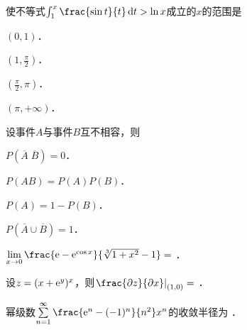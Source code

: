 \documentclass[plain,noanswer,medmath]{../../template/jnuexam}
\begin{document}










\begin{problem}
使不等式$\int_1^x \frac{\sin t}{t}\dt > \ln x$成立的$x$的范围是\pickout{}
\begin{abcd}
\item $(0,1)$．
\item $\left(1,\frac{\pi}{2} \right)$．
\item $\left(\frac{\pi}{2},\pi \right)$．
\item $(\pi , +\infty)$．
\end{abcd}
\end{problem}








\begin{problem}
设事件$A$与事件$B$互不相容，则\pickout{}
\begin{abcd}
\item $P(\overline{A}\;\overline{B}) = 0$．
\item $P(AB) = P(A)P(B)$．
\item $P(A) = 1 - P(B)$．
\item $P(\overline{A} \cup \overline{B}) = 1$．
\end{abcd}
\end{problem}






\begin{problem}
$\lim_{x \to 0} \frac{\e - \e^{\cos x}}{\sqrt[3]{1 + x^2} - 1} =$ \fillin{}．
\end{problem}


\begin{problem}
设$z = (x + \mathrm{e}^y)^x$，则$\left. \frac{\pdz}{\pdx} \right|_{(1,0)} =$ \fillin{}．
\end{problem}


\begin{problem}
幂级数$\sum_{n = 1}^{\infty}\frac{\e^n - (- 1)^n}{n^2}x^n$的收敛半径为 \fillin{}．
\end{problem}
\end{document}
